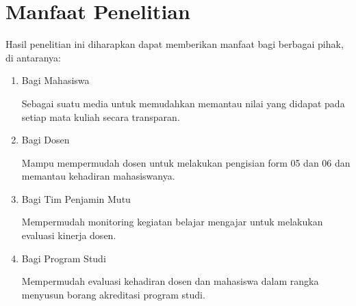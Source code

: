 \section{Manfaat Penelitian}
Hasil penelitian ini diharapkan dapat memberikan manfaat bagi berbagai pihak, di antaranya:
\begin{enumerate}
	\item Bagi Mahasiswa 
		
	Sebagai suatu media untuk memudahkan memantau nilai yang didapat pada setiap mata kuliah secara transparan.
	
	\item Bagi Dosen 
	 	
	Mampu mempermudah dosen untuk melakukan pengisian form 05 dan 06 dan memantau kehadiran mahasiswanya.

	\item Bagi Tim Penjamin Mutu

	Mempermudah monitoring kegiatan belajar mengajar untuk melakukan evaluasi kinerja dosen.

	\item Bagi Program Studi

	Mempermudah evaluasi kehadiran dosen dan mahasiswa dalam rangka menyusun borang akreditasi program studi.
\end{enumerate}


\begin{comment}

\end{comment}
